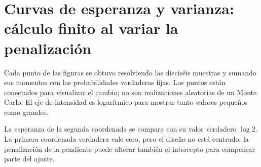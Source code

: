 \documentclass[11pt,a4paper]{article}
\begin{document}
\clearpage
\section{Curvas de esperanza y varianza: cálculo finito al variar la penalización}\label{logit146}
Cada punto de las figuras se obtuvo resolviendo las
dieciséis muestras y sumando sus momentos con
las probabilidades verdaderas fijas.
Los puntos están conectados para visualizar el cambio;
no son realizaciones aleatorias de un Monte Carlo.
El eje de intensidad es logarítmico para mostrar
tanto valores pequeños como grandes.

La esperanza de la segunda coordenada se compara
con su valor verdadero \(\log2\).
La primera coordenada verdadera vale cero,
pero el diseño no está centrado:
la penalización de la pendiente puede alterar también
el intercepto para compensar parte del ajuste.
\end{document}
